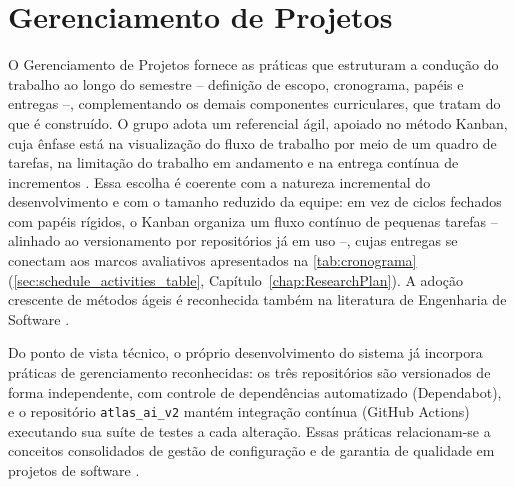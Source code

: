 \section{Gerenciamento de Projetos} \label{sec:gerenciamento_projetos}
O Gerenciamento de Projetos fornece as práticas que estruturam a condução do trabalho ao longo do semestre -- definição de escopo, cronograma, papéis e entregas --, complementando os demais componentes curriculares, que tratam do que é construído. O grupo adota um referencial ágil, apoiado no método Kanban, cuja ênfase está na visualização do fluxo de trabalho por meio de um quadro de tarefas, na limitação do trabalho em andamento e na entrega contínua de incrementos \cite{prikladnicki2014}. Essa escolha é coerente com a natureza incremental do desenvolvimento e com o tamanho reduzido da equipe: em vez de ciclos fechados com papéis rígidos, o Kanban organiza um fluxo contínuo de pequenas tarefas -- alinhado ao versionamento por repositórios já em uso --, cujas entregas se conectam aos marcos avaliativos apresentados na \autoref{tab:cronograma} (\autoref{sec:schedule_activities_table}, Capítulo~\ref{chap:ResearchPlan}). A adoção crescente de métodos ágeis é reconhecida também na literatura de Engenharia de Software \cite{sommerville2018}.

Do ponto de vista técnico, o próprio desenvolvimento do sistema já incorpora práticas de gerenciamento reconhecidas: os três repositórios são versionados de forma independente, com controle de dependências automatizado (Dependabot), e o repositório \texttt{atlas\_ai\_v2} mantém integração contínua (GitHub Actions) executando sua suíte de testes a cada alteração. Essas práticas relacionam-se a conceitos consolidados de gestão de configuração e de garantia de qualidade em projetos de software \cite{sommerville2018}.
